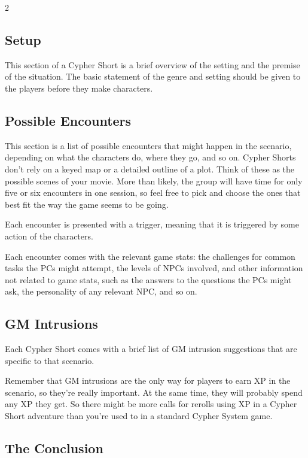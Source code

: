 \begin{multicols}{2}
\subsection{Setup}

This section of a Cypher Short is a brief overview of the setting and the premise of
the situation. The basic statement of the genre and setting should be given to the players before they make characters.

\subsection{Possible Encounters}

This section is a list of possible encounters that might happen in the scenario, depending on what the characters do, where they go, and so on. Cypher Shorts don’t rely on a keyed map or a detailed outline of a plot. Think of these as the possible scenes of your movie. More than likely, the group will have time for only five or six encounters in one session, so feel free to pick and choose the ones that best fit the way the game seems to be going.

Each encounter is presented with a trigger, meaning that it is triggered by some action of the characters.

Each encounter comes with the relevant game stats: the challenges for common tasks the PCs might attempt, the levels of NPCs involved, and other information not related to game stats, such as the answers to the questions the PCs might ask, the personality of any relevant NPC, and so on.

\subsection{GM Intrusions}

Each Cypher Short comes with a brief list of GM intrusion suggestions that are specific to that scenario.

Remember that GM intrusions are the only way for players to earn XP in the scenario, so they’re really important. At the same time, they will probably spend any XP they get. So there might be more calls for rerolls using XP in a Cypher Short adventure than you’re used to in a standard Cypher System game.

\subsection{The Conclusion}


\end{multicols}
